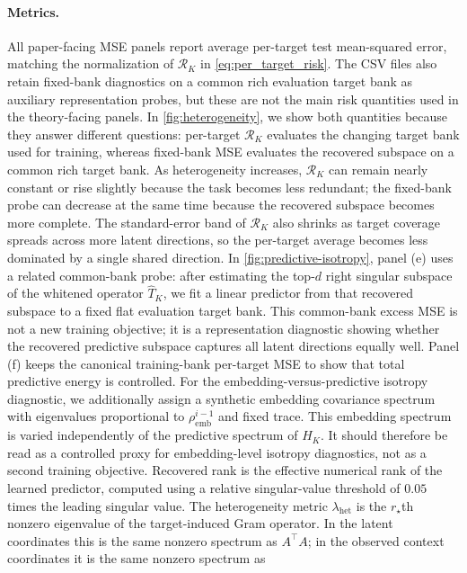 \paragraph{Metrics.}
All paper-facing MSE panels report average per-target test mean-squared error,
matching the normalization of $\mathcal R_K$ in \eqref{eq:per_target_risk}.
The CSV files also retain fixed-bank diagnostics on a common rich evaluation
target bank as auxiliary representation probes, but these are not the main
risk quantities used in the theory-facing panels. In \cref{fig:heterogeneity},
we show both quantities because they answer different questions: per-target
$\mathcal R_K$ evaluates the changing target bank used for training, whereas
fixed-bank MSE evaluates the recovered subspace on a common rich target bank.
As heterogeneity increases, $\mathcal R_K$ can remain nearly constant or rise
slightly because the task becomes less redundant; the fixed-bank probe can
decrease at the same time because the recovered subspace becomes more complete.
The standard-error band of $\mathcal R_K$ also shrinks as target coverage spreads
across more latent directions, so the per-target average becomes less dominated
by a single shared direction.
In \cref{fig:predictive-isotropy}, panel (e) uses a related common-bank probe:
after estimating the top-$d$ right singular subspace of the whitened operator
$\widehat T_K$, we fit a linear predictor from that recovered subspace to a
fixed flat evaluation target bank. This common-bank excess MSE is not a new
training objective; it is a representation diagnostic showing whether the
recovered predictive subspace captures all latent directions equally well.
Panel (f) keeps the canonical training-bank per-target MSE to show that total
predictive energy is controlled.
For the embedding-versus-predictive isotropy diagnostic, we additionally assign
a synthetic embedding covariance spectrum with eigenvalues proportional to
$\rho_{\mathrm{emb}}^{i-1}$ and fixed trace. This embedding spectrum is varied
independently of the predictive spectrum of $H_K$. It should therefore be read
as a controlled proxy for embedding-level isotropy diagnostics, not as a second
training objective.
Recovered rank is the effective numerical rank of the learned predictor,
computed using a relative singular-value threshold of $0.05$ times the leading
singular value. The heterogeneity metric $\lambda_{\mathrm{het}}$ is the
$r_\star$th nonzero eigenvalue of the target-induced Gram operator. In the
latent coordinates this is the same nonzero spectrum as $A^\top A$; in the
observed context coordinates it is the same nonzero spectrum as
